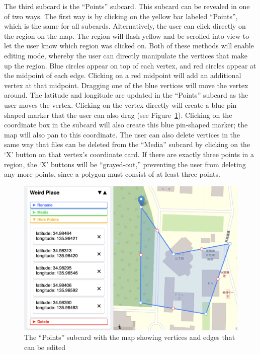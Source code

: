 \documentclass[a4paper, 10pt, american, titlepage]{article}
\begin{document}
The third subcard is the ``Points'' subcard. This subcard can be revealed in one
of two ways. The first way is by clicking on the yellow bar labeled ``Points'',
which is the same for all subcards. Alternatively, the user can click directly
on the region on the map. The region will flash yellow and be scrolled into view
to let the user know which region was clicked on. Both of these methods will
enable editing mode, whereby the user can directly manipulate the vertices that
make up the region. Blue circles appear on top of each vertex, and red circles
appear at the midpoint of each edge. Clicking on a red midpoint will add an
additional vertex at that midpoint. Dragging one of the blue vertices will move
the vertex around. The latitude and longitude are updated in the ``Points''
subcard as the user moves the vertex. Clicking on the vertex directly will
create a blue pin-shaped marker that the user can also drag (see
Figure~\ref{fig:editSubcardWithMap}). Clicking on the coordinate box in the
subcard will also create this blue pin-shaped marker; the map will also pan to
this coordinate. The user can also delete vertices in the same way that files
can be deleted from the ``Media'' subcard by clicking on the `X' button on that
vertex's coordinate card. If there are exactly three points in a region, the `X'
buttons will be ``grayed-out,'' preventing the user from deleting any more
points, since a polygon must consist of at least three points.

\begin{figure}[h]
	\centering
    \includegraphics[width=\textwidth]{edit-subcard-with-map-editour.png}
    \caption{The ``Points'' subcard with the map showing vertices and edges that
    can be edited}
	\label{fig:editSubcardWithMap}
\end{figure}
\end{document}
